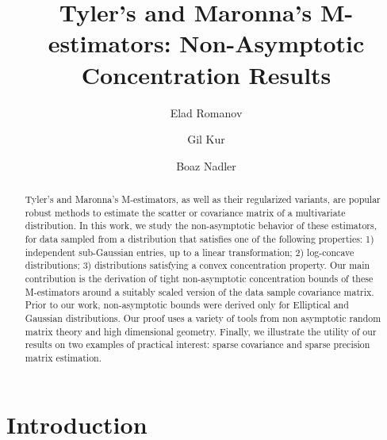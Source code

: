 \documentclass[times,sort&compress,3p]{elsarticle}
\begin{document}
\begin{frontmatter}

\title{Tyler's and Maronna's M-estimators: Non-Asymptotic Concentration Results}

\author[1]{Elad Romanov}
\author[2]{Gil Kur}
\author[3]{Boaz Nadler}

\address[1]{Department of Statistics, Stanford University}
\address[2]{Department of Electrical Engineering and Computer Science, Massachusetts Institute of Technology}
\address[3]{Faculty of Mathematics and Computer Science, Weizmann Institute of Science}


\begin{abstract}
Tyler's and Maronna's M-estimators, as well as their regularized variants, 
	are popular robust methods to estimate the scatter or covariance matrix of a multivariate distribution.
	In this work, we study the non-asymptotic behavior of these estimators, for data sampled from
	a distribution that satisfies one of the following properties: 1) independent sub-Gaussian entries, up to a linear transformation; 2) log-concave distributions; 3) distributions satisfying a convex concentration property. 
	Our main contribution is the derivation of tight non-asymptotic concentration bounds of these M-estimators around a suitably scaled version of the data sample covariance matrix.
	Prior to our work, non-asymptotic bounds were
derived only for Elliptical and Gaussian distributions.
Our proof uses a variety of tools from non asymptotic random matrix theory and high dimensional geometry.
	Finally, we illustrate the utility of our results on two examples of practical interest: sparse covariance and sparse precision matrix estimation.  
\end{abstract}


\end{frontmatter}

\section{Introduction}
        \label{sect:intro}
         
\end{document}
